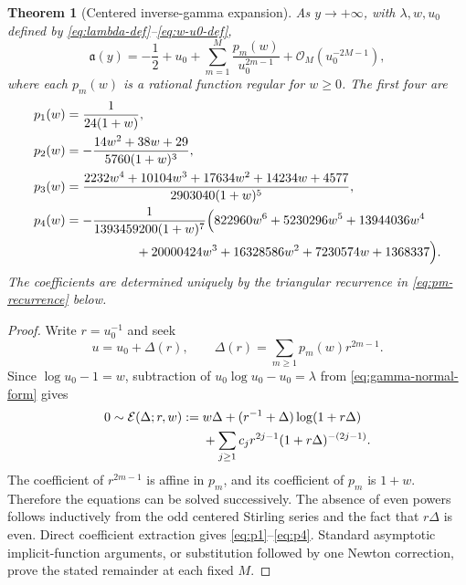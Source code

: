 \documentclass[11pt,a4paper]{article}
\numberwithin{equation}{section}
\newtheorem{theorem}{Theorem}[section]
\theoremstyle{definition}
\theoremstyle{remark}
\newcommand{\Ord}{\mathcal O}
\newcommand{\InvCore}{\mathfrak a}
\begin{document}
\begin{theorem}[Centered inverse-gamma expansion]\label{thm:inverse-gamma-expansion}
As $y\to+\infty$, with $\lambda,w,u_0$ defined by
\eqref{eq:lambda-def}--\eqref{eq:w-u0-def},
\begin{equation}\label{eq:a-pm-expansion}
 \InvCore(y)=-\frac12+u_0+
 \sum_{m=1}^{M}\frac{p_m(w)}{u_0^{2m-1}}
 +\Ord_M(u_0^{-2M-1}),
\end{equation}
where each $p_m(w)$ is a rational function regular for $w\ge0$.  The first
four are
\begin{align}
 p_1(w)&=\frac1{24(1+w)},\label{eq:p1}\\
 p_2(w)&=-\frac{14w^2+38w+29}{5760(1+w)^3},\label{eq:p2}\\
 p_3(w)&=\frac{2232w^4+10104w^3+17634w^2+14234w+4577}
 {2903040(1+w)^5},\label{eq:p3}\\
 p_4(w)&=-\frac{1}{1393459200(1+w)^7}
 \Bigl(822960w^6+5230296w^5+13944036w^4\notag\\
 &\hspace{5.5em}{}+20000424w^3+16328586w^2+7230574w+1368337\Bigr).
 \label{eq:p4}
\end{align}
The coefficients are determined uniquely by the triangular recurrence in
\eqref{eq:pm-recurrence} below.
\end{theorem}

\begin{proof}
Write $r=u_0^{-1}$ and seek
\begin{equation}\label{eq:Delta-series}
 u=u_0+\Delta(r),
 \qquad
 \Delta(r)=\sum_{m\ge1}p_m(w)r^{2m-1}.
\end{equation}
Since $\log u_0-1=w$, subtraction of
$u_0\log u_0-u_0=\lambda$ from \eqref{eq:gamma-normal-form} gives
\begin{align}
0\sim\mathcal E(\Delta;r,w):={}&
 w\Delta+(r^{-1}+\Delta)\log(1+r\Delta)\notag\\
&+\sum_{j\ge1}c_jr^{2j-1}(1+r\Delta)^{-(2j-1)}.
\label{eq:E-Delta}
\end{align}
The coefficient of $r^{2m-1}$ is affine in $p_m$, and its coefficient of
$p_m$ is $1+w$.  Therefore the equations can be solved successively.  The
absence of even powers follows inductively from the odd centered Stirling
series and the fact that $r\Delta$ is even.  Direct coefficient extraction
gives \eqref{eq:p1}--\eqref{eq:p4}.  Standard asymptotic implicit-function
arguments, or substitution followed by one Newton correction, prove the
stated remainder at each fixed $M$.
\end{proof}
\end{document}
